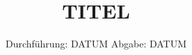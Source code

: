 

\subject{VERSUCH NUMMER}
\title{TITEL}
\date{%
  Durchführung: DATUM
  \hspace{3em}
  Abgabe: DATUM
}


\maketitle
\thispagestyle{empty}
\tableofcontents
\newpage








\printbibliography{}

